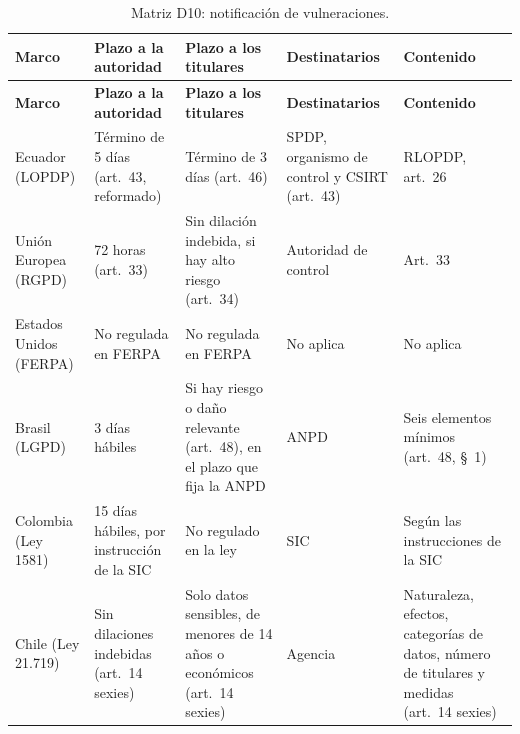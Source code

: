 {\scriptsize
\renewcommand{\arraystretch}{1.12}
\begin{xltabular}{\textwidth}{|>{\raggedright\arraybackslash}p{2.0cm}|L|L|L|L|}
  \caption{Matriz D10: notificación de vulneraciones.}
  \label{tab:matriz_d10} \\
  \hline
  \textbf{Marco} & \textbf{Plazo a la autoridad} & \textbf{Plazo a los titulares} & \textbf{Destinatarios} & \textbf{Contenido} \\
  \hline
  \endfirsthead
  \hline
  \textbf{Marco} & \textbf{Plazo a la autoridad} & \textbf{Plazo a los titulares} & \textbf{Destinatarios} & \textbf{Contenido} \\
  \hline
  \endhead
  \hline
  \endlastfoot
  Ecuador (LOPDP) & Término de 5 días (art.~43, reformado) \cite{lofc2026} & Término de 3 días (art.~46) & SPDP, organismo de control y CSIRT (art.~43) & RLOPDP, art.~26 \cite{rlopdp2023} \\ \hline
  Unión Europea (RGPD) & 72 horas (art.~33) \cite{rgpd2016} & Sin dilación indebida, si hay alto riesgo (art.~34) & Autoridad de control & Art.~33 \\ \hline
  Estados Unidos (FERPA) & No regulada en FERPA & No regulada en FERPA & No aplica & No aplica \\ \hline
  Brasil (LGPD) & 3 días hábiles \cite{anpd2024incidentes} & Si hay riesgo o daño relevante (art.~48), en el plazo que fija la ANPD & ANPD & Seis elementos mínimos (art.~48, §~1) \\ \hline
  Colombia (Ley 1581) & 15 días hábiles, por instrucción de la SIC \cite{sic2020incidentes} & No regulado en la ley & SIC & Según las instrucciones de la SIC \cite{sic2020incidentes} \\ \hline
  Chile (Ley 21.719) & Sin dilaciones indebidas (art.~14 sexies) \cite{chile2024ley21719} & Solo datos sensibles, de menores de 14 años o económicos (art.~14 sexies) & Agencia & Naturaleza, efectos, categorías de datos, número de titulares y medidas (art.~14 sexies) \\ \hline
\end{xltabular}
}

